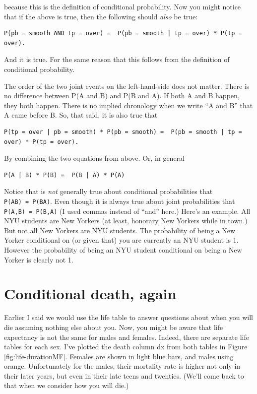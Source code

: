 \documentclass[openany]{book}
\begin{document}
because this is the definition of conditional probability. Now you might notice that if the above is true, then the following should \emph{also} be true:

\begin{verbatim}
P(pb = smooth AND tp = over) =  P(pb = smooth | tp = over) * P(tp = over).
\end{verbatim}

And it is true. For the same reason that this follows from the definition of conditional probability.

The order of the two joint events on the left-hand-side does not matter. There is no difference between P(A and B) and P(B and A). If both A and B happen, they both happen. There is no implied chronology when we write ``A and B'' that A came before B. So, that said, it is also true that

\begin{verbatim}
P(tp = over | pb = smooth) * P(pb = smooth) =  P(pb = smooth | tp = over) * P(tp = over).
\end{verbatim}

By combining the two equations from above. Or, in general

\begin{verbatim}
P(A | B) * P(B) =  P(B | A) * P(A)
\end{verbatim}

Notice that is \emph{not} generally true about conditional probabilities that \texttt{P(A\textbar{}B)\ =\ P(B\textbar{}A)}. Even though it is always true about joint probabilities that \texttt{P(A,B)\ =\ P(B,A)} (I used commas instead of ``and'' here.) Here's an example. All NYU students are New Yorkers (at least, honorary New Yorkers while in town.) But not all New Yorkers are NYU students. The probability of being a New Yorker conditional on (or given that) you are currently an NYU student is 1. However the probability of being an NYU student conditional on being a New Yorker is clearly not 1.

\hypertarget{conditional-death-again}{%
\section*{Conditional death, again}\label{conditional-death-again}}

Earlier I said we would use the life table to answer questions about when you will die assuming nothing else about you. Now, you might be aware that life expectancy is not the same for males and females. Indeed, there are separate life tables for each sex. I've plotted the death column dx from both tables in Figure \ref{fig:life-durationMF}. Females are shown in light blue bars, and males using orange. Unfortunately for the males, their mortality rate is higher not only in their later years, but even in their late teens and twenties. (We'll come back to that when we consider how you will die.)
\end{document}
